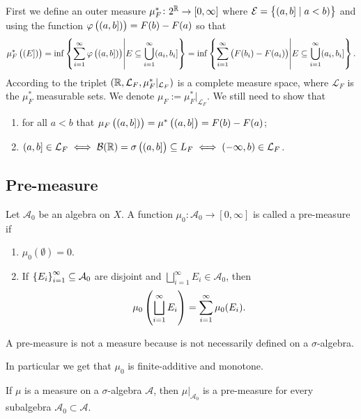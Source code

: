 \documentclass[11pt,a4paper]{article}
\newcommand{\A}{\mathcal A}
\begin{document}
First we define an outer measure $\mu_{F}^{*} \colon 2^{\mathbb{R}} \to [0,\infty]$
where $\mathcal E = \left\{(a,b] \mid a < b)\right\}$ and
using the function $\varphi\del{(a,b])} = F(b) - F(a)$ so that
\[
  \mu_{F}^{*}\del{(E])} =
  \inf\set{\sum_{i=1}^{\infty} \varphi\del{(a,b])}
    \middle\vert E \subseteq \bigcup_{i=1}^{\infty} (a_i,b_i]} =
  \inf\set{\sum_{i=1}^{\infty} \del{F(b_i) - F(a_i)}
    \middle\vert E \subseteq \bigcup_{i=1}^{\infty} (a_i,b_i]}.
\]
According to  the triplet
$(\mathbb{R}, \mathcal L_{F}, \mu_{F}^{*}\vert_{\mathcal L_{F}})$
is a complete measure space, where $\mathcal L_{F}$ is the $\mu_{F}^{*}$
measurable sets.
We denote $\mu_{F} := \mu_{F}^{*}\vert_{\mathcal L_{F}}$.
We still need to show that
\begin{enumerate}
  \item[(1)] for all $a < b$ that
    $\mu_{F}\del{(a,b])} = \mu^{*}\del{(a,b]} = F(b) - F(a)$;
  \item[(2)] $(a,b] \in \mathcal L_{F} \iff \mathcal B(\R) = \sigma\del{(a,b]} \subseteq L_F \iff (\ninfty,b) \in \mathcal L_{F}$.
\end{enumerate}

\subsection{Pre-measure}

\begin{definition}
  Let $\A_0$ be an algebra on $X$.
  A function $\mu_0 \colon \A_0 \to [0,\infty]$ is called a pre-measure if
  \begin{enumerate}
    \item[(1)] $\mu_0(\emptyset) = 0$.
    \item[(2)] If $\set{E_i}_{i=1}^{\infty} \subseteq \A_0$ are disjoint
      and $\bigsqcup_{i=1}^{\infty} E_i \in \A_0$, then
      \[
        \mu_0\del{\bigsqcup_{i=1}^{\infty} E_i} =
        \sum_{i=1}^{\infty} \mu_0(E_i).
      \]
  \end{enumerate}
\end{definition}
\begin{remark}
  A pre-measure is not a measure because is not necessarily defined on
  a $\sigma$-algebra.
\end{remark}
\begin{remark}
  In particular we get that $\mu_0$ is finite-additive and monotone.
\end{remark}
\begin{remark}
  If $\mu$ is a measure on a $\sigma$-algebra $\A$,
  then $\mu\vert_{\A_0}$ is a pre-measure for every subalgebra
  $\A_0 \subset \A$.
\end{remark}
\end{document}
